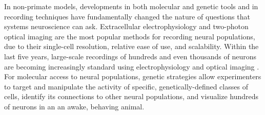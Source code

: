 

In non-primate models, developments in both molecular and genetic tools and in recording techniques have fundamentally changed the nature of questions that systems neuroscience can ask. Extracellular electrophysiology and two-photon optical imaging are the most popular methods for recording neural populations, due to their single-cell resolution, relative ease of use, and scalability. Within the last five years, large-scale recordings of hundreds and even thousands of neurons are becoming increasingly standard using electrophysiology \cite{Stringer2019,Steinmetz2019,Siegle2021} and optical imaging \cite{Sofroniew2016,Stringer2019geometry, Weisenburger2019}. For molecular access to neural populations, genetic strategies allow experimenters to target and manipulate the activity of specific, genetically-defined classes of cells\cite{Kerlin2010, Atallah2012, Adesnik2012}, identify its connections to other neural populations, and visualize hundreds of neurons in an an awake, behaving animal\cite{Andermann2010,Chen2012,Poort2015,Burgess2017,Dana2019}. 

